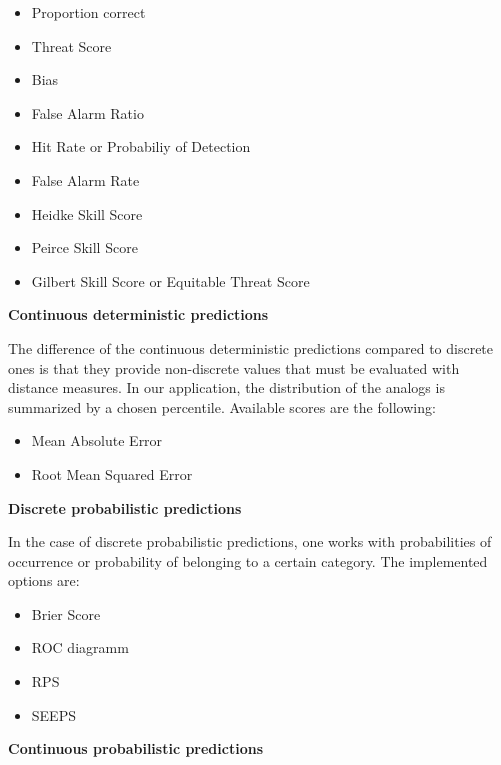 \documentclass[review]{elsarticle}
\begin{document}
\begin{itemize}
	\setlength\itemsep{-1mm}
	\item Proportion correct \citep{Finley1884}
	\item Threat Score \citep{Gilbert1884}
	\item Bias
	\item False Alarm Ratio
	\item Hit Rate or Probabiliy of Detection
	\item False Alarm Rate
	\item Heidke Skill Score \citep{Heidke1926}
	\item Peirce Skill Score \citep{Peirce1884}
	\item Gilbert Skill Score or Equitable Threat Score \citep{Gilbert1884}
\end{itemize}


\textbf{Continuous deterministic predictions}

The difference of the continuous deterministic predictions compared to discrete ones is that they provide non-discrete values that must be evaluated with distance measures. In our application, the distribution of the analogs is summarized by a chosen percentile. Available scores are the following:

\begin{itemize}
	\setlength\itemsep{-1mm}
	\item Mean Absolute Error
	\item Root Mean Squared Error
\end{itemize}


\textbf{Discrete probabilistic predictions}

In the case of discrete probabilistic predictions, one works with probabilities of occurrence or probability of belonging to a certain category. The implemented options are:

\begin{itemize}
	\setlength\itemsep{-1mm}
	\item Brier Score \citep{Brier1950}
	\item ROC diagramm \citep[Relative Operating Characteristic or Receiver Operating Characteristic,][]{Mason1982}
	\item RPS \citep[Ranked Probability Score,][]{Epstein1969}
	\item SEEPS \citep[Stable Equitable Error in Probability Space,][]{Rodwell2010,Rodwell2011}
\end{itemize}


\textbf{Continuous probabilistic predictions}
\label{sec:prob_forecasts}
\end{document}
